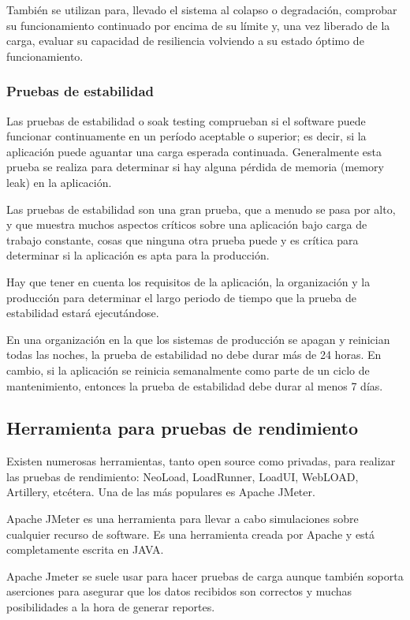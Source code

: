 También se utilizan para, llevado el sistema al colapso o degradación, comprobar su funcionamiento continuado por encima de su límite y, una vez liberado de la carga, evaluar su capacidad de resiliencia volviendo a su estado óptimo de funcionamiento.

\subsubsection{Pruebas de estabilidad}

Las pruebas de estabilidad o soak testing comprueban si el software puede funcionar continuamente en un período aceptable o superior; es decir, si la aplicación puede aguantar una carga esperada continuada. Generalmente esta prueba se realiza para determinar si hay alguna pérdida de memoria (memory leak) en la aplicación.

Las pruebas de estabilidad son una gran prueba, que a menudo se pasa por alto, y que muestra muchos aspectos críticos sobre una aplicación bajo carga de trabajo constante, cosas que ninguna otra prueba puede y es crítica para determinar si la aplicación es apta para la producción.

Hay que tener en cuenta los requisitos de la aplicación, la organización y la producción para determinar el largo periodo de tiempo que la prueba de estabilidad estará ejecutándose.

En una organización en la que los sistemas de producción se apagan y reinician todas las noches, la prueba de estabilidad no debe durar más de 24 horas. En cambio, si la aplicación se reinicia semanalmente como parte de un ciclo de mantenimiento, entonces la prueba de estabilidad debe durar al menos 7 días.

\subsection{Herramienta para pruebas de rendimiento}

Existen numerosas herramientas, tanto open source como privadas, para realizar las pruebas de rendimiento: NeoLoad, LoadRunner, LoadUI, WebLOAD, Artillery, etcétera. Una de las más populares es Apache JMeter.

Apache JMeter es una herramienta para llevar a cabo simulaciones sobre cualquier recurso de software. Es una herramienta creada por Apache y está completamente escrita en JAVA.

Apache Jmeter se suele usar para hacer pruebas de carga aunque también soporta aserciones para asegurar que los datos recibidos son correctos y muchas posibilidades a la hora de generar reportes.

